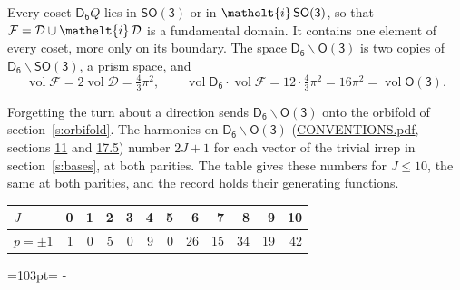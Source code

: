 \documentclass[10pt,a4paper]{article}
\newcommand{\needspace}[1]{\par\penalty-100\begingroup\dimen0=#1\relax\dimen2=\pagegoal
  \advance\dimen2-\pagetotal\ifdim\dimen0>\dimen2\relax\ifdim\dimen2>0pt\vfil\break\fi\fi
  \endgroup}
\numberwithin{equation}{section}
\newcommand{\eltfont}[1]{{\let\sigma\eltsigma\mathelt{#1}}}
\newcommand{\grp}[1]{\mathsf{#1}}
\newcommand{\elt}[1]{\eltfont{#1}}
\newcommand{\vol}{\operatorname{vol}}
\newcommand{\fcell}{\mathcal{D}}
\newcommand{\fdomain}{\mathcal{F}}
\begin{document}
\leavevmode\label{n:set.fundamental}Every coset $\grp{D_{6}}Q$ lies in \href{SO3.pdf}{$\grp{SO(3)}$} or in $\elt{i}\,\grp{SO(3)}$, so that $\fdomain = \fcell \cup \elt{i}\,\fcell$ is a fundamental domain. It contains one element of every coset, more only on its boundary.
The space $\grp{D_{6}}\backslash\grp{O(3)}$ is two copies of $\grp{D_{6}}\backslash\grp{SO(3)}$, a prism space, and
\begin{equation}\label{e:volume}\vol\fdomain = 2\vol\fcell = \tfrac{4}{3}\pi^2,\qquad \vol\grp{D_{6}}\cdot\vol\fdomain = 12\cdot \tfrac{4}{3}\pi^2 = 16\pi^2 = \vol\grp{O(3)}.\end{equation}

Forgetting the turn about a direction sends $\grp{D_{6}}\backslash\grp{O(3)}$ onto the orbifold of section~\ref{s:orbifold}.
The harmonics on $\grp{D_{6}}\backslash\grp{O(3)}$ (\href{../../CONVENTIONS.pdf}{CONVENTIONS.pdf}, sections \href{../../CONVENTIONS.pdf\#conv.11}{11} and \href{../../CONVENTIONS.pdf\#conv.17.5}{17.5}) number $2J + 1$ for each vector of the trivial irrep in section~\ref{s:bases}, at both parities. The table gives these numbers for $J \le 10$, the same at both parities, and the record holds their generating functions.
{\small\setlength{\tabcolsep}{4pt}\begin{longtable}{@{}lrrrrrrrrrrr@{}}\toprule
$J$ & 0 & 1 & 2 & 3 & 4 & 5 & 6 & 7 & 8 & 9 & 10\\\midrule\endhead
\bottomrule\endfoot\endlastfoot
$p = \pm 1$ & 1 & 0 & 5 & 0 & 9 & 0 & 26 & 15 & 34 & 19 & 42\\
\bottomrule\end{longtable}}
\needspace{103pt}
\end{document}
